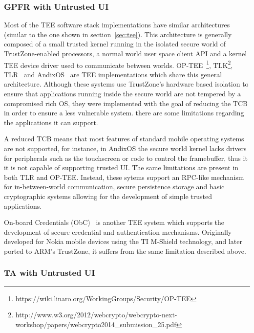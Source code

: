 \subsubsection{GPFR with Untrusted UI}

Most of the \ac{TEE} software stack implementations have similar architectures (similar to the one shown in section~\ref{sec:tee}). This architecture is generally composed of a small trusted kernel running in the isolated secure world of TrustZone-enabled processors, a normal world user space client API and a kernel TEE device driver used to communicate between worlds. OP-TEE~\footnote{https://wiki.linaro.org/WorkingGroups/Security/OP-TEE}, TLK\footnote{http://www.w3.org/2012/webcrypto/webcrypto-next-workshop/papers/webcrypto2014\_submission\_25.pdf}, TLR~\cite{santos2011trusted} and AndixOS~\cite{fitzekandix} are \ac{TEE} implementations which share this general architecture. Although these systems use TrustZone's hardware based isolation to ensure that applications running inside the secure world are not tempered by a compromised rich OS, they were implemented with the goal of reducing the \ac{TCB} in order to ensure a less vulnerable system. there are some limitations regarding the applications it can support.

A reduced \ac{TCB} means that most features of standard mobile operating systems are not supported, for instance, in AndixOS the secure world kernel lacks drivers for peripherals such as the touchscreen or code to control the framebuffer, thus it it is not capable of supporting trusted UI. The same limitations are present in both TLR and OP-TEE. Instead, these sytems support an RPC-like mechanism for in-between-world communication, secure persistence storage and basic cryptographic systems allowing for the development of simple trusted applications.


On-board Credentials (ObC)~\cite{kostiainen2012board} is another \ac{TEE} system which supports the development of secure credential and authentication mechanisms. Originally developed for Nokia mobile devices using the TI M-Shield technology, and later ported to ARM's TrustZone, it suffers from the same limitation described above.

\subsubsection{TA with Untrusted UI}

